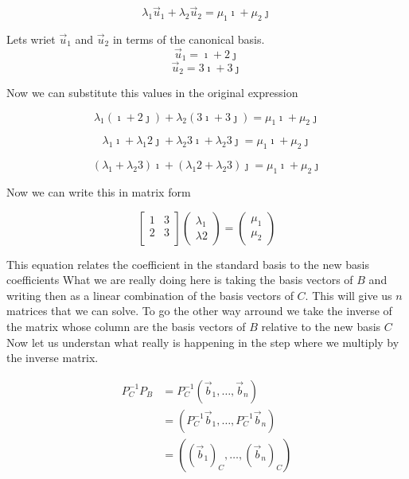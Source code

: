 \[\lambda_1 \vec{u}_1 + \lambda_2 \vec{u}_2 = \mu_1 \imath + \mu_2 \jmath \]

Lets wriet \(\vec{u}_1\) and \(\vec{u}_2\) in terms of the canonical basis.
\[\vec{u}_1 = \imath + 2 \jmath\]
\[\vec{u}_2 = 3 \imath + 3 \jmath\]

Now we can substitute this values in the original expression

\[\lambda_1 (\imath + 2 \jmath) + \lambda_2 (3 \imath + 3 \jmath) = \mu_1 \imath + \mu_2 \jmath \]

\[\lambda_1 \imath + \lambda_1 2 \jmath + \lambda_2 3 \imath + \lambda_2 3 \jmath = \mu_1 \imath + \mu_2 \jmath \]

\[(\lambda_1  +  \lambda_2 3)\imath + (\lambda_1 2  + \lambda_2 3) \jmath = \mu_1 \imath + \mu_2 \jmath \]

Now we can write this in matrix form

\[
\begin{bmatrix}
    1 & 3 \\
    2 & 3 \\
\end{bmatrix} \begin{pmatrix}
    \lambda_1 \\ \lambda2
\end{pmatrix} = \begin{pmatrix}
    \mu_1 \\ \mu_2
\end{pmatrix}
\]

This equation relates the coefficient in the standard basis to the new basis
coefficients
\newline
What we are really doing here is taking the basis vectors of \(B\) and writing then as a linear combination
of the basis vectors of \(C\). This will give us \(n\) matrices that we can solve.
\newline
To go the other way arround we take the inverse of the matrix whose column are the basis vectors of \(B\)
relative to the new basis \(C\)
\newline
Now let us understan what really is happening in the step where we multiply by the inverse matrix.

\begin{align*}
P_{C}^{-1} P_B &= P_{C}^{-1}(\vec{b}_1, \dots, \vec{b}_n) \\
&= (P_{C}^{-1}\vec{b}_1, \dots, P_{C}^{-1}\vec{b}_n)\\
&= ((\vec{b}_1)_C, \dots, (\vec{b}_n)_C)
\end{align*}

